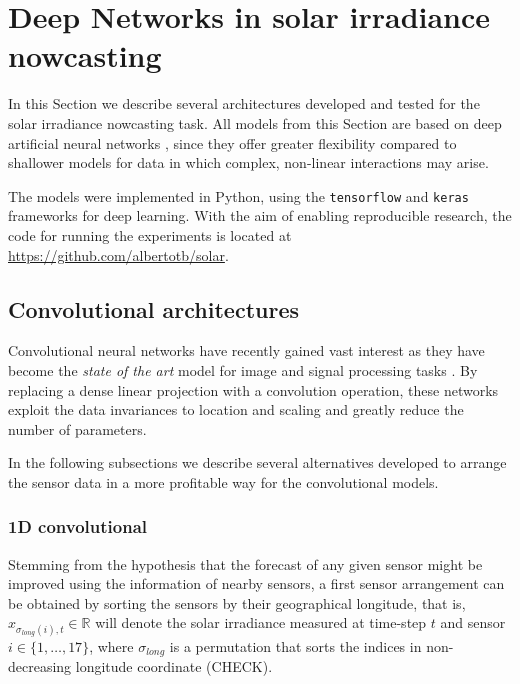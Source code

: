 \documentclass[preprints,article,accept,moreauthors,pdftex]{template/mdpi}
\begin{document}
\section{Deep Networks in solar irradiance nowcasting}\label{sec:models}

In this Section we describe several architectures developed and tested for the solar irradiance nowcasting task. All models from this Section are based on deep artificial neural networks \cite{Goodfellow-et-al-2016}, since they offer greater flexibility compared to shallower models for data in which complex, non-linear interactions may arise. 

The models were implemented in Python, using the \texttt{tensorflow} \cite{abadi2016tensorflow} and \texttt{keras} \cite{chollet2015keras} frameworks for deep learning. With the aim of enabling reproducible research, the code for running the experiments is located at \url{https://github.com/albertotb/solar}.

\subsection{Convolutional architectures}

Convolutional neural networks \cite{krizhevsky2012imagenet} have recently gained vast interest as they have become the \emph{state of the art} model for image and signal processing tasks \cite{ji20123d, karpathy2014large, abdel2014convolutional}. By replacing a dense linear projection with a convolution operation, these networks exploit the data invariances to location and scaling and greatly reduce the number of parameters.

In the following subsections we describe several alternatives developed to arrange the sensor data in a more profitable way for the convolutional models.

\subsubsection{1D convolutional}

Stemming from the hypothesis that the forecast of any given sensor might be improved using the information of nearby sensors, a first sensor arrangement can be obtained by sorting the sensors by their geographical longitude, that is, $ x_{\sigma_{long}(i),t} \in \mathbb{R}$ will denote the solar irradiance measured at time-step $t$ and sensor $i \in \lbrace 1, \ldots, 17 \rbrace$, where $\sigma_{long}$ is a permutation that sorts the indices in non-decreasing longitude coordinate (CHECK).
\end{document}
